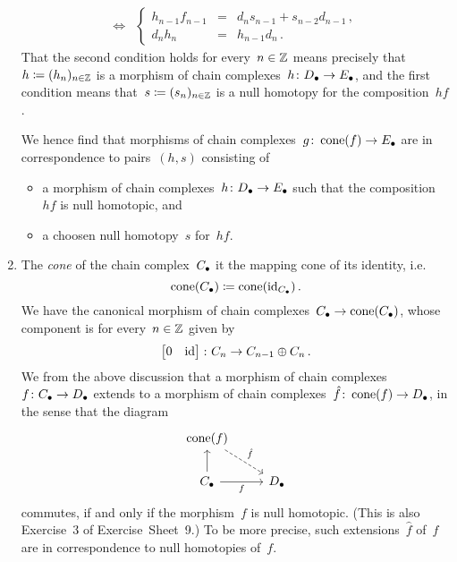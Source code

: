 \begin{remark*}
\begin{enumerate}
\begin{align*}
        \iff&{}   \left\{
                    \begin{array}{rcl}
                      h_{n-1} f_{n-1} &=& d_n s_{n-1} + s_{n-2} d_{n-1} \,, \\
                      d_n h_n     &=& h_{n-1} d_n \,.
                    \end{array}
                  \right.
      \end{align*}
      That the second condition holds for every~$n \in \mathbb{Z}$ means precisely that~$h \coloneqq (h_n)_{n \in \mathbb{Z}}$ is a morphism of chain complexes~$h \colon D_\bullet \to E_\bullet$, and the first condition means that~$s \coloneqq (s_n)_{n \in \mathbb{Z}}$ is a null homotopy for the composition~$h f$.
      
      We hence find that morphisms of chain complexes~$g \colon \operatorname{cone}(f) \to E_\bullet$ are in {\onetoone} correspondence to pairs~$(h,s)$ consisting of
      \begin{itemize}
        \item
          a morphism of chain complexes~$h \colon D_\bullet \to E_\bullet$ such that the composition~$hf$ is null homotopic, and
        \item
          a choosen null homotopy~$s$ for~$hf$.
      \end{itemize}
    \item
      The \emph{cone} of the chain complex~$C_\bullet$ it the mapping cone of its identity, i.e.\
      \[
                  \operatorname{cone}(C_\bullet)
        \coloneqq  \operatorname{cone}(\operatorname{id}_{C_\bullet}) \,.
      \]
      We have the canonical morphism of chain complexes~$C_\bullet \to \operatorname{cone}(C_\bullet)$, whose~ component is for every~$n \in \mathbb{Z}$ given by
      \[
        \begin{bmatrix}
            0
          & \operatorname{id}
        \end{bmatrix}
        \colon
        C_n
        \to
        C_{n-1} \oplus C_n \,.
      \]
      We from the above discussion that a morphism of chain complexes~$f \colon C_\bullet \to D_\bullet$ extends to a morphism of chain complexes~$\hat{f} \colon \operatorname{cone}(f) \to D_\bullet$, in the sense that the diagram
      \[
        \begin{tikzcd}
            \cone(f)
            \arrow[dashed]{dr}[above right]{\hat{f}}
          & {}
          \\
            \Ccc
            \arrow{u}
            \arrow{r}[below]{f}
          & \Dcc
        \end{tikzcd}
      \]
      commutes, if and only if the morphism~$f$ is null homotopic.
      (This is also Exercise~3 of Exercise~Sheet~9.)
      To be more precise, such extensions~$\hat{f}$ of~$f$ are in {\onetoone} correspondence to null homotopies of~$f$.
  \end{enumerate}
\end{remark*}










